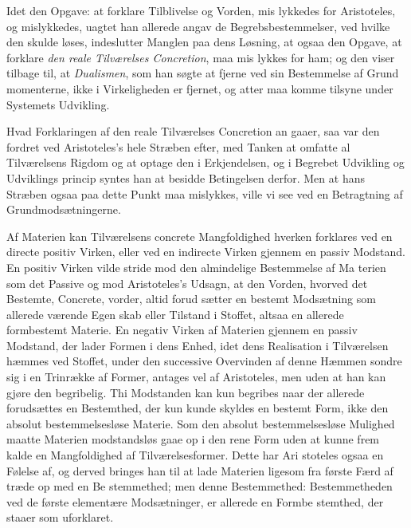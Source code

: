 \documentclass[12pt,a4paper]{book}
\begin{document}
Idet den Opgave: at forklare Tilblivelse og Vorden, mis\-%
lykkedes for Aristoteles, og mislykkedes, uagtet han allerede
angav de Begrebsbestemmelser, ved hvilke den skulde løses,
indeslutter Manglen paa dens Løsning, at ogsaa den Opgave,
at forklare \emph{den reale Tilværelses Concretion}, maa mis\-%
lykkes for ham; og den viser tilbage til, at \emph{Dualismen},
som han søgte at fjerne ved sin Bestemmelse af Grund\-%
momenterne, ikke i Virkeligheden er fjernet, og atter maa
komme tilsyne under Systemets Udvikling.

Hvad Forklaringen af den reale Tilværelses Concretion an\-%
gaaer, saa var den fordret ved Aristoteles's hele Stræben efter,
med Tanken at omfatte al Tilværelsens Rigdom og at optage
den i Erkjendelsen, og i Begrebet Udvikling og Udviklings\-%
princip syntes han at besidde Betingelsen derfor. Men at
hans Stræben ogsaa paa dette Punkt maa mislykkes, ville vi
see ved en Betragtning af Grundmodsætningerne.

Af Materien kan Tilværelsens concrete Mangfoldighed
hverken forklares ved en directe positiv Virken, eller ved en
indirecte Virken gjennem en passiv Modstand. En positiv
Virken vilde stride mod den almindelige Bestemmelse af Ma\-%
terien som det Passive og mod Aristoteles's Udsagn, at den
Vorden, hvorved det Bestemte, Concrete, vorder, altid forud\-%
sætter en bestemt Modsætning som allerede værende Egen\-%
skab eller Tilstand i Stoffet, altsaa en allerede formbestemt
Materie. En negativ Virken af Materien gjennem en passiv
Modstand, der lader Formen i dens Enhed, idet dens Realisation
i Tilværelsen hæmmes ved Stoffet, under den successive
Overvinden af denne Hæmmen sondre sig i en Trinrække af
Former, antages vel af Aristoteles, men uden at han kan gjøre
den begribelig. Thi Modstanden kan kun begribes naar der
allerede forudsættes en Bestemthed, der kun kunde skyldes en
bestemt Form, ikke den absolut bestemmelsesløse Materie.
Som den absolut bestemmelsesløse Mulighed maatte Materien
modstandsløs gaae op i den rene Form uden at kunne frem\-%
kalde en Mangfoldighed af Tilværelsesformer. Dette har Ari\-%
stoteles ogsaa en Følelse af, og derved bringes han til at lade
Materien ligesom fra første Færd af træde op med en Be\-%
stemmethed; men denne Bestemmethed: Bestemmetheden ved
de første elementære Modsætninger, er allerede en Formbe\-%
stemthed, der staaer som uforklaret.
\end{document}
